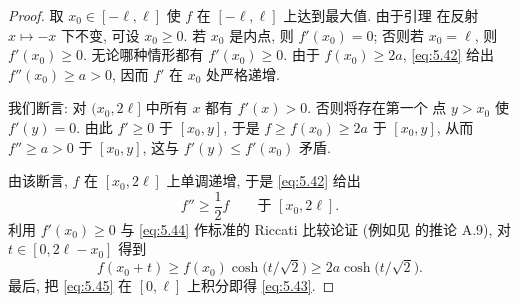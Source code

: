 \begin{proof}
取 $x_0\in[-\ell,\ell]$ 使 $f$ 在 $[-\ell,\ell]$ 上达到最大值. 由于引理
在反射 $x\mapsto-x$ 下不变, 可设 $x_0\geq 0$. 若 $x_0$ 是内点, 则
$f'(x_0)=0$; 否则若 $x_0=\ell$, 则 $f'(x_0)\geq 0$. 无论哪种情形都有
$f'(x_0)\geq 0$. 由于 $f(x_0)\geq 2a$, \eqref{eq:5.42} 给出
$f''(x_0)\geq a>0$, 因而 $f'$ 在 $x_0$ 处严格递增.

我们断言: 对 $(x_0,2\ell]$ 中所有 $x$ 都有 $f'(x)>0$. 否则将存在第一个
点 $y>x_0$ 使 $f'(y)=0$. 由此 $f'\geq 0$ 于 $[x_0,y]$, 于是
$f\geq f(x_0)\geq 2a$ 于 $[x_0,y]$, 从而 $f''\geq a>0$ 于 $[x_0,y]$,
这与 $f'(y)\leq f'(x_0)$ 矛盾.

由该断言, $f$ 在 $[x_0,2\ell]$ 上单调递增, 于是 \eqref{eq:5.42} 给出
\begin{equation}
f''\geq\frac12f\qquad\text{于 }[x_0,2\ell].
\label{eq:5.44}
\end{equation}
利用 $f'(x_0)\geq 0$ 与 \eqref{eq:5.44} 作标准的 Riccati 比较论证
(例如见 \cite{CDM} 的推论 A.9), 对 $t\in[0,2\ell-x_0]$ 得到
\begin{equation}
f(x_0+t)\geq f(x_0)\cosh\bigl(t/\sqrt2\bigr)
\geq 2a\cosh\bigl(t/\sqrt2\bigr).
\label{eq:5.45}
\end{equation}
最后, 把 \eqref{eq:5.45} 在 $[0,\ell]$ 上积分即得 \eqref{eq:5.43}.
\end{proof}

